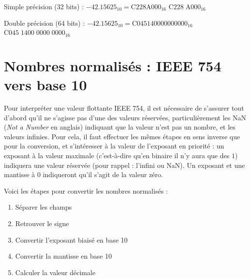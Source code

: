 \documentclass[11pt,a4paper]{article}
\begin{document}
\bigskip


Simple précision (32 bits) : $ -42.15625_{10} = \text{C}228\text{A}000_{16} $  \hfill $ \text{C}228 \; \text{A}000_{16} $  \hfill \phantom{Texte.}

\medskip

Double précision (64 bits) : $ -42.15625_{10} = \text{C}045140000000000_{16} $  \hfill  $ \text{C}045 \; 1400 \; 0000 \; 0000_{16}$  \hfill \phantom{Texte}



\bigskip


\section{Nombres normalisés : IEEE 754 vers base 10}

\bigskip

Pour interpréter une valeur flottante IEEE 754, il est nécessaire de s'assurer tout d'abord qu'il ne s'agisse pas d'une des valeurs réservées, particulièrement les NaN (\textit{Not a Number} en anglais) indiquant que la valeur n'est pas un nombre, et les valeurs infinies.
Pour cela, il faut effectuer les mêmes étapes en sens inverse que pour la conversion, et s'intéresser à la valeur de l'exposant en priorité : un exposant à la valeur maximale (c'est-à-dire qu'en binaire il n'y aura que des $ 1 $) indiquera une valeur réservée (pour rappel : l'infini ou NaN).
Un exposant et une mantisse à $ 0 $ indiqueront qu'il s'agit de la valeur zéro.

\medskip

Voici les étapes pour convertir les nombres normalisés :

\begin{enumerate}
\item Séparer les champs
\item Retrouver le signe
\item Convertir l'exposant biaisé en base 10
\item Convertir la mantisse en base 10
\item Calculer la valeur décimale
\end{enumerate}
\end{document}
